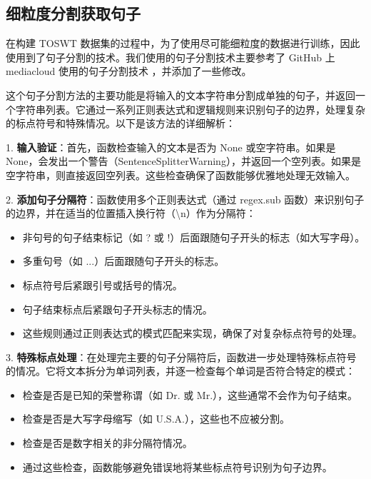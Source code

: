 \subsection{细粒度分割获取句子}
\label{sec:TOSWT-gen-sentence_splitter}

在构建 TOSWT 数据集的过程中，为了使用尽可能细粒度的数据进行训练，因此使用到了句子分割的技术。我们使用的句子分割技术主要参考了 GitHub 上 mediacloud 使用的句子分割技术 \cite{sentence-splitter}，并添加了一些修改。

这个句子分割方法的主要功能是将输入的文本字符串分割成单独的句子，并返回一个字符串列表。它通过一系列正则表达式和逻辑规则来识别句子的边界，处理复杂的标点符号和特殊情况。以下是该方法的详细解析：

1. \textbf{输入验证}：首先，函数检查输入的文本是否为 None 或空字符串。如果是 None，会发出一个警告（SentenceSplitterWarning），并返回一个空列表。如果是空字符串，则直接返回空列表。这些检查确保了函数能够优雅地处理无效输入。

2. \textbf{添加句子分隔符}：函数使用多个正则表达式（通过 regex.sub 函数）来识别句子的边界，并在适当的位置插入换行符（\textbackslash{}n）作为分隔符：

\begin{itemize}
\item[\textbullet] 非句号的句子结束标记（如 ? 或 !）后面跟随句子开头的标志（如大写字母）。
\item[\textbullet] 多重句号（如 ...）后面跟随句子开头的标志。
\item[\textbullet] 标点符号后紧跟引号或括号的情况。
\item[\textbullet] 句子结束标点后紧跟句子开头标志的情况。
\item[\textbullet] 这些规则通过正则表达式的模式匹配来实现，确保了对复杂标点符号的处理。
\end{itemize}


3. \textbf{特殊标点处理}：在处理完主要的句子分隔符后，函数进一步处理特殊标点符号的情况。它将文本拆分为单词列表，并逐一检查每个单词是否符合特定的模式：

\begin{itemize}
\item[\textbullet]检查是否是已知的荣誉称谓（如 Dr. 或 Mr.），这些通常不会作为句子结束。
\item[\textbullet]检查是否是大写字母缩写（如 U.S.A.），这些也不应被分割。
\item[\textbullet]检查是否是数字相关的非分隔符情况。
\item[\textbullet]通过这些检查，函数能够避免错误地将某些标点符号识别为句子边界。
\end{itemize}

